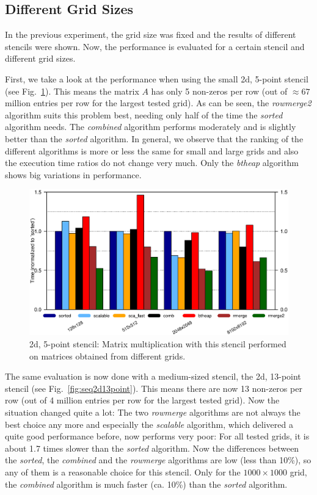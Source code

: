 \subsection{Different Grid Sizes}

In the previous experiment, the grid size was fixed and the results of different stencils were shown. Now, the performance is evaluated for a certain stencil and different grid sizes. 

First, we take a look at the performance when using the small 2d, 5-point stencil (see Fig.~\ref{fig:seq2d5point}). This means the matrix $A$ has only 5 non-zeros per row (out of $\approx 67$ million entries per row for the largest tested grid). As can be seen, the \textit{rowmerge2} algorithm suits this problem best, needing only half of the time the \textit{sorted} algorithm needs. The \textit{combined} algorithm performs moderately and is slightly better than the \textit{sorted} algorithm. In general, we observe that the ranking of the different algorithms is more or less the same for small and large grids and also the execution time ratios do not change very much. Only the \textit{btheap} algorithm shows big variations in performance.

\begin{figure}[tbp]
	\centering
	\hspace*{-7mm}\includegraphics[width=1.05\textwidth, trim={0 6.9cm 0 1cm},clip]{seq_2d5point}
	\caption{2d, 5-point stencil: Matrix multiplication with this stencil performed on matrices obtained from different grids.} 
	\label{fig:seq2d5point}
\end{figure}

The same evaluation is now done with a medium-sized stencil, the 2d, 13-point stencil (see Fig.~\ref{fig:seq2d13point}). This means there are now 13 non-zeros per row (out of 4 million entries per row for the largest tested grid). Now the situation changed quite a lot: The two \textit{rowmerge} algorithms are not always the best choice any more and especially the \textit{scalable} algorithm, which delivered a quite good performance before, now performs very poor: For all tested grids, it is about 1.7 times slower than the \textit{sorted} algorithm. Now the differences between the \textit{sorted}, the \textit{combined} and the \textit{rowmerge} algorithms are low (less than 10\%), so any of them is a reasonable choice for this stencil. Only for the $1000 \times 1000$ grid, the \textit{combined} algorithm is much faster (ca. 10\%) than the \textit{sorted} algorithm.

